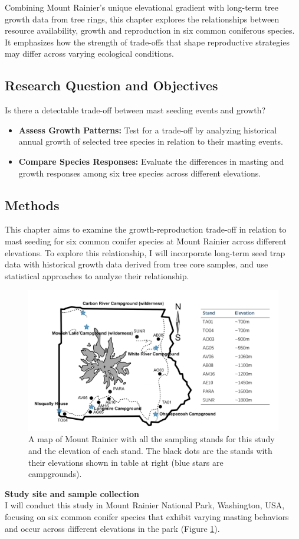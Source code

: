 \documentclass[11pt,letter]{article}
\begin{document}
Combining Mount Rainier's unique elevational gradient with long-term tree growth data from tree rings, this chapter explores the relationships between resource availability, growth and reproduction in six common coniferous species. It emphasizes how the strength of trade-offs that shape reproductive strategies may differ across varying ecological conditions.

\subsection{Research Question and Objectives}
Is there a detectable trade-off between mast seeding events and growth?
	\begin{itemize}
	\item \textbf{Assess Growth Patterns:} Test for a trade-off by analyzing historical annual growth of selected tree species in relation to their masting events.
	\item \textbf{Compare Species Responses:} Evaluate the differences in masting and growth responses among six tree species across different elevations.
	\end{itemize}
\subsection{Methods}
This chapter aims to examine the growth-reproduction trade-off in relation to mast seeding for six common conifer species at Mount Rainier across different elevations. To explore this relationship, I will incorporate long-term seed trap data with historical growth data derived from tree core samples, and use statistical approaches to analyze their relationship.

\begin{figure}[htb]
	\centering
	\includegraphics[width=1\linewidth]{rainierMap.png}
	\caption{A map of Mount Rainier with all the sampling stands for this study and the elevation of each stand. The black dots are the stands with their elevations shown in table at right (blue stars are campgrounds).}
	\label{fig:sites}
\end{figure}
\textbf{Study site and sample collection}\\
I will conduct this study in Mount Rainier National Park, Washington, USA, focusing on six common conifer species that exhibit varying masting behaviors and occur across different elevations in the park (Figure \ref{fig:sites}).
\end{document}

